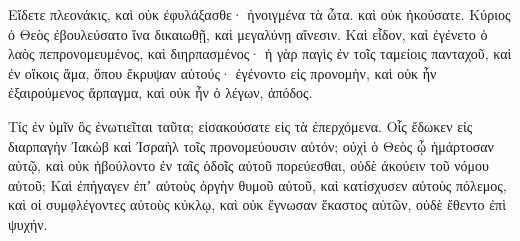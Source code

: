 {Εἴδετε πλεονάκις, καὶ οὐκ ἐφυλάξασθε· ἠνοιγμένα τὰ ὦτα. καὶ οὐκ ἠκούσατε.
Κύριος ὁ Θεὸς ἐβουλεύσατο ἵνα δικαιωθῇ, καὶ μεγαλύνῃ αἴνεσιν.
Καὶ εἶδον, καὶ ἐγένετο ὁ λαὸς πεπρονομευμένος, καὶ διηρπασμένος· ἡ γὰρ παγὶς ἐν τοῖς ταμείοις πανταχοῦ, καὶ ἐν οἴκοις ἅμα, ὅπου ἔκρυψαν αὐτούς· ἐγένοντο εἰς προνομὴν, καὶ οὐκ ἦν ἐξαιρούμενος ἅρπαγμα, καὶ οὐκ ἦν ὁ λέγων, ἀπόδος.
\par }{\PP {}Τίς ἐν ὑμῖν ὃς ἐνωτιεῖται ταῦτα; εἰσακούσατε εἰς τὰ ἐπερχόμενα.
Οἷς ἔδωκεν εἰς διαρπαγὴν Ἰακὼβ καὶ Ἰσραὴλ τοῖς προνομεύουσιν αὐτόν; οὐχὶ ὁ Θεὸς ᾧ ἡμάρτοσαν αὐτῷ, καὶ οὐκ ἠβούλοντο ἐν ταῖς ὁδοῖς αὐτοῦ πορεύεσθαι, οὐδὲ ἀκούειν τοῦ νόμου αὐτοῦ;
Καὶ ἐπήγαγεν ἐπʼ αὐτοὺς ὀργὴν θυμοῦ αὐτοῦ, καὶ κατίσχυσεν αὐτοὺς πόλεμος, καὶ οἱ συμφλέγοντες αὐτοὺς κύκλῳ, καὶ οὐκ ἔγνωσαν ἕκαστος αὐτῶν, οὐδὲ ἔθεντο ἐπὶ ψυχήν.

}
